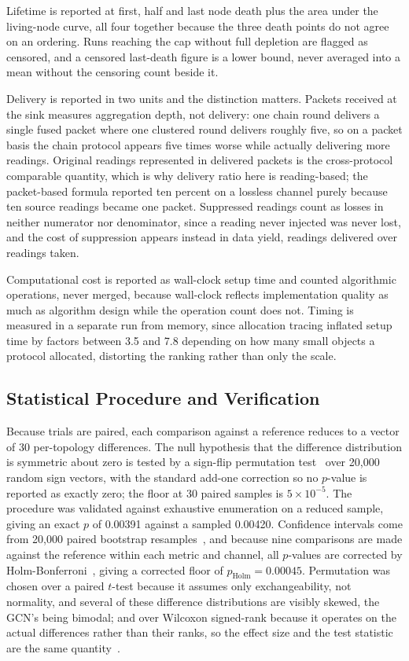 Lifetime is reported at first, half and last node death plus the area under the
living-node curve, all four together because the three death points do not agree
on an ordering. Runs reaching the cap without full depletion are flagged as
censored, and a censored last-death figure is a lower bound, never averaged into
a mean without the censoring count beside it.

Delivery is reported in two units and the distinction matters. Packets received
at the sink measures aggregation depth, not delivery: one chain round delivers a
single fused packet where one clustered round delivers roughly five, so on a
packet basis the chain protocol appears five times worse while actually
delivering more readings. Original readings represented in delivered packets is
the cross-protocol comparable quantity, which is why delivery ratio here is
reading-based; the packet-based formula reported ten percent on a lossless
channel purely because ten source readings became one packet. Suppressed
readings count as losses in neither numerator nor denominator, since a reading
never injected was never lost, and the cost of suppression appears instead in
data yield, readings delivered over readings taken.

Computational cost is reported as wall-clock setup time and counted algorithmic
operations, never merged, because wall-clock reflects implementation quality as
much as algorithm design while the operation count does not. Timing is measured
in a separate run from memory, since allocation tracing inflated setup time by
factors between 3.5 and 7.8 depending on how many small objects a protocol
allocated, distorting the ranking rather than only the scale.

\subsection{Statistical Procedure and Verification}
\label{sec:stats}

Because trials are paired, each comparison against a reference reduces to a
vector of 30 per-topology differences. The null hypothesis that the difference
distribution is symmetric about zero is tested by a sign-flip permutation
test~\cite{good2005permutation} over 20{,}000 random sign vectors, with the
standard add-one correction so no $p$-value is reported as exactly zero; the
floor at 30 paired samples is $5\times10^{-5}$. The procedure was validated
against exhaustive enumeration on a reduced sample, giving an exact $p$ of
0.00391 against a sampled 0.00420. Confidence intervals come from 20{,}000
paired bootstrap resamples~\cite{efron1993bootstrap}, and because nine
comparisons are made against the reference within each metric and channel, all
$p$-values are corrected by Holm-Bonferroni~\cite{holm1979stepdown}, giving a
corrected floor of $p_{\mathrm{Holm}} = 0.00045$. Permutation was chosen over a
paired $t$-test because it assumes only exchangeability, not normality, and
several of these difference distributions are visibly skewed, the GCN's being
bimodal; and over Wilcoxon signed-rank because it operates on the actual
differences rather than their ranks, so the effect size and the test statistic
are the same quantity~\cite{demsar2006statistical}.

